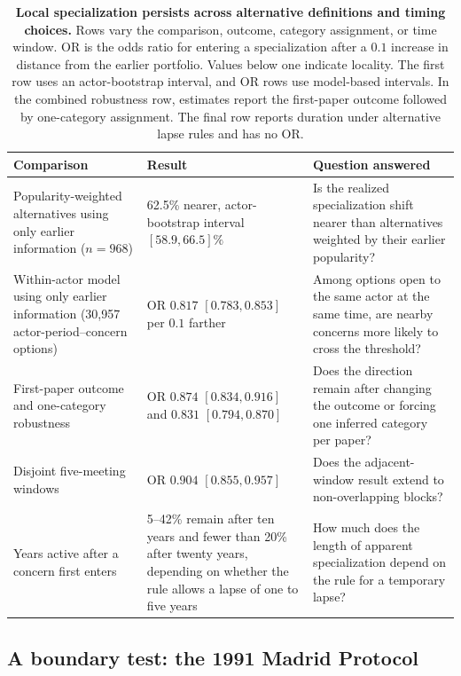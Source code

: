 \documentclass{fun_article}
\begin{document}
\begin{table}[!htbp]
\centering
\scriptsize
\caption{\textbf{Local specialization persists across alternative definitions and timing choices.} Rows vary the comparison, outcome, category assignment, or time window. OR is the odds ratio for entering a specialization after a $0.1$ increase in distance from the earlier portfolio. Values below one indicate locality. The first row uses an actor-bootstrap interval, and OR rows use model-based intervals. In the combined robustness row, estimates report the first-paper outcome followed by one-category assignment. The final row reports duration under alternative lapse rules and has no OR.}
\label{tab:locality_estimands}
\begin{tabular}{@{}p{}p{}p{}@{}}
\hline
\textbf{Comparison} & \textbf{Result} & \textbf{Question answered} \\
\hline
Popularity-weighted alternatives using only earlier information ($n=968$) & 62.5\% nearer, actor-bootstrap interval $[58.9,66.5]\%$ & Is the realized specialization shift nearer than alternatives weighted by their earlier popularity? \\
\hline
Within-actor model using only earlier information (30,957 actor-period--concern options) & OR $0.817$ $[0.783,0.853]$ per $0.1$ farther & Among options open to the same actor at the same time, are nearby concerns more likely to cross the threshold? \\
\hline
First-paper outcome and one-category robustness & OR $0.874$ $[0.834,0.916]$ and $0.831$ $[0.794,0.870]$ & Does the direction remain after changing the outcome or forcing one inferred category per paper? \\
\hline
Disjoint five-meeting windows & OR $0.904$ $[0.855,0.957]$ & Does the adjacent-window result extend to non-overlapping blocks? \\
\hline
Years active after a concern first enters & 5--42\% remain after ten years and fewer than 20\% after twenty years, depending on whether the rule allows a lapse of one to five years & How much does the length of apparent specialization depend on the rule for a temporary lapse? \\
\hline
\end{tabular}
\end{table}

\FloatBarrier

\subsection{A boundary test: the 1991 Madrid Protocol}\label{sec:madrid-shock}
\end{document}
